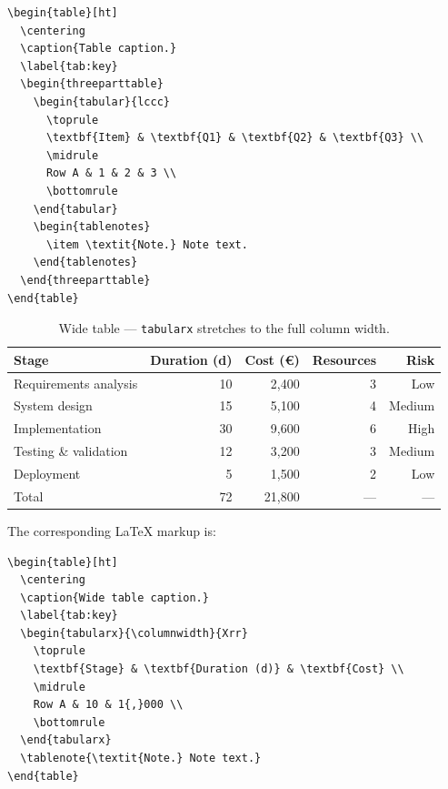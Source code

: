 \documentclass{wpom-upv}
\begin{document}
\begin{verbatim}
\begin{table}[ht]
  \centering
  \caption{Table caption.}
  \label{tab:key}
  \begin{threeparttable}
    \begin{tabular}{lccc}
      \toprule
      \textbf{Item} & \textbf{Q1} & \textbf{Q2} & \textbf{Q3} \\
      \midrule
      Row A & 1 & 2 & 3 \\
      \bottomrule
    \end{tabular}
    \begin{tablenotes}
      \item \textit{Note.} Note text.
    \end{tablenotes}
  \end{threeparttable}
\end{table}
\end{verbatim}

\begin{table}[ht]
  \centering
  \caption{Wide table — \texttt{tabularx} stretches to the full column width.}
  \label{tab:wide}
  \begin{tabularx}{\columnwidth}{Xrrrr}
    \toprule
    \textbf{Stage} & \textbf{Duration (d)} & \textbf{Cost (\euro)} & \textbf{Resources} & \textbf{Risk} \\
    \midrule
    Requirements analysis  & 10 & 2{,}400 & 3 & Low    \\
    System design          & 15 & 5{,}100 & 4 & Medium \\
    Implementation         & 30 & 9{,}600 & 6 & High   \\
    Testing \& validation  & 12 & 3{,}200 & 3 & Medium \\
    Deployment             &  5 & 1{,}500 & 2 & Low    \\
    \midrule
    Total                  & 72 & 21{,}800 & --- & --- \\
    \bottomrule
  \end{tabularx}
\end{table}

The corresponding \LaTeX{} markup is:

\begin{verbatim}
\begin{table}[ht]
  \centering
  \caption{Wide table caption.}
  \label{tab:key}
  \begin{tabularx}{\columnwidth}{Xrr}
    \toprule
    \textbf{Stage} & \textbf{Duration (d)} & \textbf{Cost} \\
    \midrule
    Row A & 10 & 1{,}000 \\
    \bottomrule
  \end{tabularx}
  \tablenote{\textit{Note.} Note text.}
\end{table}
\end{verbatim}
\end{document}
